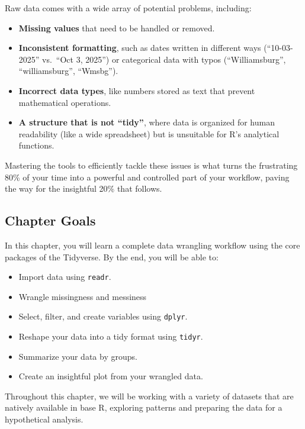 \documentclass[
  11pt,
]{article}
\providecommand{\tightlist}{%
  \setlength{\itemsep}{0pt}\setlength{\parskip}{0pt}}
\begin{document}
Raw data comes with a wide array of potential problems, including:

\begin{itemize}
\tightlist
\item
  \textbf{Missing values} that need to be handled or removed.
\item
  \textbf{Inconsistent formatting}, such as dates written in different
  ways (``10-03-2025'' vs.~``Oct 3, 2025'') or categorical data with
  typos (``Williamsburg'', ``williamsburg'', ``Wmsbg'').
\item
  \textbf{Incorrect data types}, like numbers stored as text that
  prevent mathematical operations.
\item
  \textbf{A structure that is not ``tidy''}, where data is organized for
  human readability (like a wide spreadsheet) but is unsuitable for R's
  analytical functions.
\end{itemize}

Mastering the tools to efficiently tackle these issues is what turns the
frustrating 80\% of your time into a powerful and controlled part of
your workflow, paving the way for the insightful 20\% that follows.

\subsection{Chapter Goals}\label{chapter-goals}

In this chapter, you will learn a complete data wrangling workflow using
the core packages of the Tidyverse. By the end, you will be able to:

\begin{itemize}
\tightlist
\item
  Import data using \texttt{readr}.
\item
  Wrangle missingness and messiness
\item
  Select, filter, and create variables using \texttt{dplyr}.
\item
  Reshape your data into a tidy format using \texttt{tidyr}.
\item
  Summarize your data by groups.
\item
  Create an insightful plot from your wrangled data.
\end{itemize}

Throughout this chapter, we will be working with a variety of datasets
that are natively available in base R, exploring patterns and preparing
the data for a hypothetical analysis.
\end{document}
